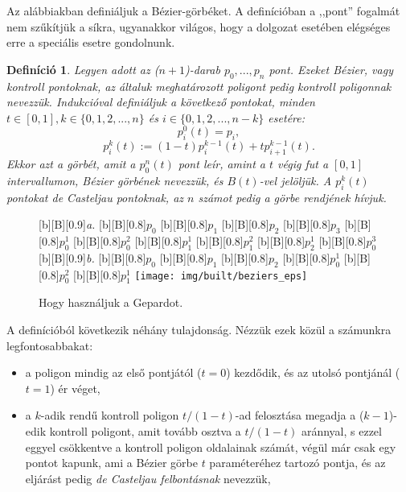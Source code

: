 \documentclass[12pt]{report}
\newtheorem{defi}[tét]{Definíció}
\theoremstyle{definition}
\begin{document}
Az alábbiakban definiáljuk a Bézier-görbéket. A definícióban a ,,pont'' fogalmát
nem szűkítjük a síkra, ugyanakkor világos, hogy a dolgozat esetében elégséges
erre a speciális esetre gondolnunk.

\begin{defi}\label{Bézier}\cite[Kurusa]{Kurusa:1999:szamitogepes}
Legyen adott az ($n+1$)-darab $p_0,...,p_n$ pont. Ezeket Bézier, vagy kontroll
pontoknak, az általuk meghatározott poligont pedig kontroll poligonnak nevezzük.
Indukcióval definiáljuk a következő pontokat, minden $t \in [0,1], k \in
\{{0,1,2,...,n\}}$ és $i \in \{{0,1,2,...,n-k\}}$ esetére:
\[p^0_i(t)=p_i,\]
\[p^k_i(t):=(1-t)p^{k-1}_i(t) + tp^{k-1}_{i+1}(t).\]
Ekkor azt a görbét, amit a $p^n_0(t)$ pont leír, amint a $t$ végig fut a $[0,1]$
intervallumon, Bézier görbének nevezzük, és $B(t)$-vel jelöljük. A $p^k_i(t)$
pontokat de Casteljau pontoknak, az $n$ számot pedig a görbe rendjének hívjuk.
\end{defi}

  \begin{figure}[!htb]
  [b][B][0.9]{\emph{a.}}
  [b][B][0.8]{\bf{$p_{0}$}}
  [b][B][0.8]{\bf{$p_{1}$}}
  [b][B][0.8]{\bf{$p_{2}$}}
  [b][B][0.8]{\bf{$p_{3}$}}
  [b][B][0.8]{\bf{$p_{0}^{1}$}}
  [b][B][0.8]{\bf{$p_{0}^{2}$}}
  [b][B][0.8]{\bf{$p_{1}^{1}$}}
  [b][B][0.8]{\bf{$p_{1}^{2}$}}
  [b][B][0.8]{\bf{$p_{2}^{1}$}}
  [b][B][0.8]{\bf{$p_{0}^{3}$}}
  [b][B][0.9]{\emph{b.}}
  [b][B][0.8]{\bf{$p_{0}$}}
  [b][B][0.8]{\bf{$p_{1}$}}
  [b][B][0.8]{\bf{$p_{2}$}}
  [b][B][0.8]{\bf{$p_{0}^{1}$}}
  [b][B][0.8]{\bf{$p_{0}^{2}$}}
  [b][B][0.8]{\bf{$p_{1}^{1}$}}
    \centering
    \texttt{[image: img/built/beziers\_eps]}
    \caption{\label{beziers} Hogy használjuk a Gepardot.}
  \end{figure}

A definícióból következik néhány tulajdonság. Nézzük ezek közül a
számunkra legfontosabbakat:
\begin{itemize}
  \item a poligon mindig az első pontjától ($t=0$) kezdődik, és az utolsó
  pontjánál ($t=1$) ér véget,
  \item a $k$-adik rendű kontroll poligon $t/(1-t)$-ad felosztása megadja a
  ($k-1$)-edik kontroll poligont, amit tovább osztva a $t/(1-t)$ aránnyal, s
  ezzel eggyel csökkentve a kontroll poligon oldalainak számát, végül már csak
  egy pontot kapunk, ami a Bézier görbe $t$ paraméteréhez tartozó pontja, és az
  eljárást pedig \emph{de Casteljau felbontásnak} nevezzük,
\end{itemize}
\end{document}
